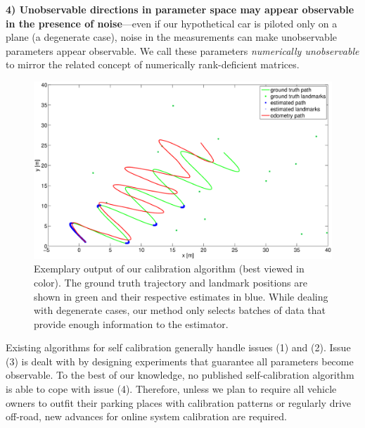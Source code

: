 {\bf 4) Unobservable directions in parameter space may appear observable in the
presence of noise}---even if our hypothetical car is piloted only on a plane (a
degenerate case), noise in the measurements can make unobservable parameters
appear observable. We call these parameters {\em numerically unobservable} to
mirror the related concept of numerically rank-deficient matrices.

\begin{figure}[t]
\centering
\includegraphics[width=\columnwidth]{fig/sin-path-result.eps}
\caption{Exemplary output of our calibration algorithm (best viewed in
color). The ground truth trajectory and landmark positions are shown in green
and their respective estimates in blue. While dealing with degenerate cases, our
method only selects batches of data that provide enough information to the
estimator.}
\label{fig:calib_demo}
\end{figure}

Existing algorithms for self calibration generally handle issues (1) and (2).
Issue (3) is dealt with by designing experiments that guarantee all parameters
become observable. To the best of our knowledge, no published self-calibration
algorithm is able to cope with issue (4). Therefore, unless we plan to require
all vehicle owners to outfit their parking places with calibration patterns or
regularly drive off-road, new advances for online system calibration are
required.

